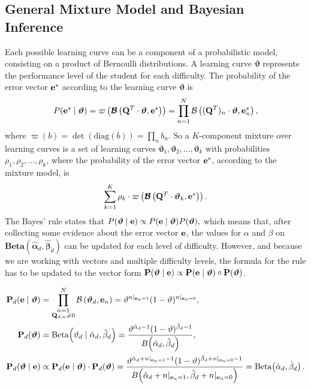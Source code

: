 \documentclass{article}
\newcommand{\0}{\mathbbold{0}}
\newcommand{\1}{\mathds{1}}
\newcommand{\diag}[1]{\text{diag}\!\left(#1\right)}
\newcommand{\Beta}[2]{\text{Beta}\!\left(#1,#2\right)}
\newcommand{\BBeta}[2]{\textbf{Beta}\!\left(#1,#2\right)}
\begin{document}
\subsection{General Mixture Model and Bayesian Inference}
Each possible learning curve can be a component of a probabilistic model, consisting on a product of Bernoulli distributions.
A learning curve $\boldsymbol{\vartheta}$ represents the performance level of the student for each difficulty.
The probability of the error vector ${\bf e}^s$ according to the learning curve $\boldsymbol{\vartheta}$ is
$$ P({\bf e}^s \mid \boldsymbol{\vartheta}) = \varpi\left(\boldsymbol{\mathcal{B}}\left({\bf Q}^T \cdot \boldsymbol{\vartheta}, {\bf e}^s\right)\right) = \prod_{n=1}^{N} \mathcal{B}\left(({\bf Q}^T)_n \cdot \boldsymbol{\vartheta}, {\bf e}^s_n \right),$$
where $\varpi(b) = \det\!\left(\diag{b}\right) = \prod_n b_n$.
So a $K$-component mixture over learning curves is a set of learning curves $\boldsymbol{\vartheta}_1, \boldsymbol{\vartheta}_2, \dots, \boldsymbol{\vartheta}_k$ with probabilities $\rho_1, \rho_2, \dots, \rho_k$, where the probability of the error vector ${\bf e}^s$, according to the mixture model, is
$$ \sum_{k=1}^K \rho_k \cdot \varpi\left(\boldsymbol{\mathcal{B}}\left({\bf Q}^T \cdot \boldsymbol{\vartheta}_k, {\bf e}^s\right)\right). $$
The Bayes' rule states that $ P(\boldsymbol{\vartheta} \mid {\bf e}) \propto P({\bf e} \mid \boldsymbol{\vartheta}) P({\boldsymbol \vartheta}), $ which means that, after collecting some evidence about the error vector ${\bf e}$, the values for $\alpha$ and $\beta$ on $\BBeta{\boldsymbol{\hat{\alpha}}_d}{\boldsymbol{\hat{\beta}}_d}$ can be updated for each level of difficulty.
However, and because we are working with vectors and multiple difficulty levels, the formula for the rule has to be updated to the vector form ${\bf P}(\boldsymbol{\vartheta} \mid {\bf e}) \propto {\bf P}({\bf e} \mid \boldsymbol{\vartheta}) \circ {\bf P}({\boldsymbol \vartheta})$.

\begin{align*}
    {\bf P}_d({\bf e} \mid \boldsymbol{\vartheta}) &= \prod_{\substack{n=1 \\ {\bf Q}_{d, n} \ne 0}}^N \mathcal{B}\left(\boldsymbol{\vartheta}_d, {\bf e}_n \right) = \vartheta^{n|_{{\bf e}_n = 1}}(1 - \vartheta)^{n|_{{\bf e}_n = 0}}, \\
    {\bf P}_d(\boldsymbol{\vartheta}) &= \Beta{\vartheta_d \mid \hat{\alpha}_d}{\hat{\beta}_d} = \frac{\vartheta^{\hat{\alpha}_d - 1}(1 - \vartheta)^{\hat{\beta}_d - 1}}{B\!\left(\hat{\alpha}_d,\hat{\beta}_d\right)}, \\
    {\bf P}_d(\boldsymbol{\vartheta} \mid {\bf e}) &\propto {\bf P}_d({\bf e} \mid \boldsymbol{\vartheta}) \cdot {\bf P}_d(\boldsymbol{\vartheta}) = \frac{\vartheta^{\hat{\alpha}_d + n|_{{\bf e}_n = 1} - 1}(1 - \vartheta)^{\hat{\beta}_d + n|_{{\bf e}_n = 0} - 1}}{B\!\left(\hat{\alpha}_d + n|_{{\bf e}_n = 1},\hat{\beta}_d + n|_{{\bf e}_n = 0}\right)} = \Beta{\dot{\alpha}_d}{\dot{\beta}_d}.
\end{align*}
\end{document}
